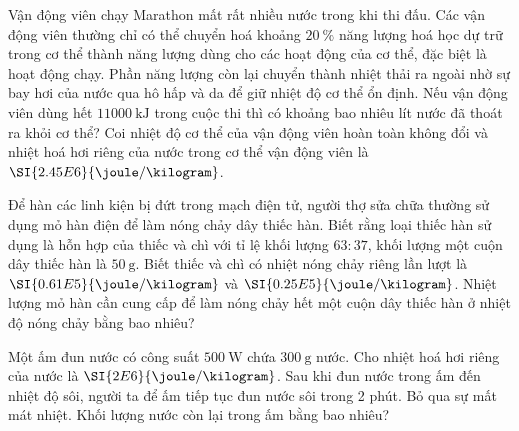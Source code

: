 \begin{ex}
	Vận động viên chạy Marathon mất rất nhiều nước trong khi thi đấu. Các vận động viên thường chỉ có thể chuyển hoá khoảng $\SI{20}{\percent}$ năng lượng hoá học dự trữ trong cơ thể thành năng lượng dùng cho các hoạt động của cơ thể, đặc biệt là hoạt động chạy. Phần năng lượng còn lại chuyển thành nhiệt thải ra ngoài nhờ sự bay hơi của nước qua hô hấp và da để giữ nhiệt độ cơ thể ổn định. Nếu vận động viên dùng hết $\SI{11000}{\kilo\joule}$ trong cuộc thi thì có khoảng bao nhiêu lít nước đã thoát ra khỏi cơ thể? Coi nhiệt độ cơ thể của vận động viên hoàn toàn không đổi và nhiệt hoá hơi riêng của nước trong cơ thể vận động viên là $\SI{2.45E6}{\joule/\kilogram}$.
	\end{ex}
\begin{ex}
	Để hàn các linh kiện bị đứt trong mạch điện tử, người thợ sửa chữa thường sử dụng mỏ hàn điện để làm nóng chảy dây thiếc hàn. Biết rằng loại thiếc hàn sử dụng là hỗn hợp của thiếc và chì với tỉ lệ khối lượng $63:37$, khối lượng một cuộn dây thiếc hàn là $\SI{50}{\gram}$. Biết thiếc và chì có nhiệt nóng chảy riêng lần lượt là $\SI{0.61E5}{\joule/\kilogram}$ và $\SI{0.25E5}{\joule/\kilogram}$. Nhiệt lượng mỏ hàn cần cung cấp để làm nóng chảy hết một cuộn dây thiếc hàn ở nhiệt độ nóng chảy bằng bao nhiêu?
\end{ex}
\begin{ex}
Một ấm đun nước có công suất $\SI{500}{\watt}$ chứa $\SI{300}{\gram}$ nước. Cho nhiệt hoá hơi riêng của nước là $\SI{2E6}{\joule/\kilogram}$. Sau khi đun nước trong ấm đến nhiệt độ sôi, người ta để ấm tiếp tục đun nước sôi trong 2 phút. Bỏ qua sự mất mát nhiệt. Khối lượng nước còn lại trong ấm bằng bao nhiêu?
\end{ex}
